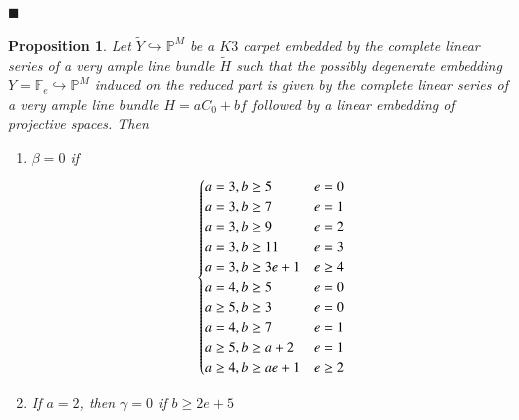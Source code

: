 \documentclass[11pt,twoside]{amsart}
\theoremstyle{plain}
\numberwithin{equation}{section}
\newtheorem{proposition}[theorem]{Proposition}
\theoremstyle{definition}
\newcommand*{\QEDA}{\hfill\ensuremath{\blacksquare}}
\begin{document}
\QEDA



\begin{proposition}\label{calculating beta}
Let $\widetilde{Y} \hookrightarrow \mathbb{P}^M$ be a $K3$ carpet embedded by the complete linear series of a very ample line bundle $\widetilde{H}$ such that the possibly degenerate embedding $Y = \mathbb{F}_e \hookrightarrow \mathbb{P}^M$ induced on the reduced part is given by the complete linear series of a very ample line bundle $H = aC_0+bf$ followed by a linear embedding of projective spaces.   
Then 

\begin{enumerate}
    \item $\beta = 0$ if
    \[
\begin{cases}
    a = 3, b \geq 5 & e = 0  \\
    a = 3, b \geq 7 & e = 1  \\
    a = 3, b \geq 9 & e = 2  \\
\color{black}
    a = 3, b \geq 11 &  \textcolor{black}{e = 3} \\
    a = 3, b \geq 3e+1 & e \geq 4 \\
\color{black}
    a = 4, b \geq 5 & e = 0 \\
    a \geq 5, b \geq 3 & e = 0 \\
    \textcolor{black}{a = 4, b \geq 7} & \textcolor{black}{e = 1} \\
   \textcolor{black}{a \geq 5}, b \geq a+2 & e = 1 \\
    a \geq 4, b \geq ae+1 & e \geq 2 \\
    
\end{cases}
  \]

  \item If $a = 2$, then $\gamma = 0$ if $b \geq 2e+5$



\end{enumerate}
  

 


\end{proposition}
 
\end{document}

